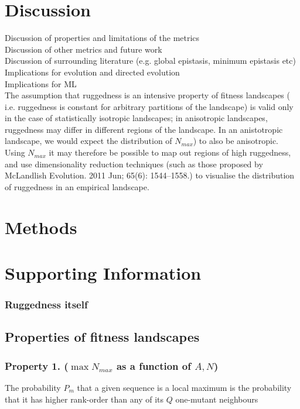 \documentclass[10pt, reqno]{amsart}
\begin{document}
\section{Discussion}

Discussion of properties and limitations of the metrics \\
Discussion of other metrics and future work\\
Discussion of surrounding literature (e.g. global epistasis, minimum epistasis etc) \\
Implications for evolution and directed evolution\\
Implications for ML \\



The assumption that ruggedness is an intensive property of fitness landscapes ( i.e. ruggedness is constant for arbitrary partitions of the landscape) is valid only in the case of statistically isotropic landscapes; in anisotropic landscapes, ruggedness may differ in different regions of the landscape. In an anistotropic landscape, we would expect the distribution of $N_{max}$) to also be anisotropic. Using $N_{max}$ it may therefore be possible to map out regions of high ruggedness, and use dimensionality reduction techniques (such as those proposed by McLandlish Evolution. 2011 Jun; 65(6): 1544–1558.) to visualise the distribution of ruggedness in an empirical landscape.



\section{Methods}

\section{Supporting Information}

\subsubsection{Ruggedness itself}




\subsection{Properties of fitness landscapes}

\subsubsection*{ Property 1. ($\max N_{max}$ as a function of $A, N$)} 
The probability $P_m$ that a given sequence is a local maximum is the probability that it has higher rank-order than any of its $Q$ one-mutant neighbours \supercite{Kauffman1993, Kauffman1987, Rosenberg2005}
\end{document}
